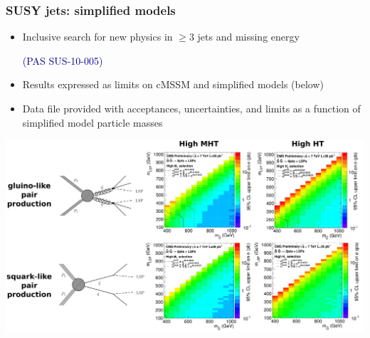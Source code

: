 \documentclass[compress]{beamer}
\begin{document}
\begin{frame}
\frametitle{SUSY jets: simplified models}

\begin{itemize}
\item Inclusive search for new physics in $\ge 3$ jets and missing energy

\hfill \textcolor{darkblue}{\scriptsize (PAS SUS-10-005)}

\item Results expressed as limits on cMSSM and simplified models (below)

\item Data file provided with acceptances, uncertainties, and limits as a function of simplified model particle masses
\end{itemize}

\includegraphics[width=\linewidth]{plots/sms_plots.pdf}
\end{frame}
\end{document}
